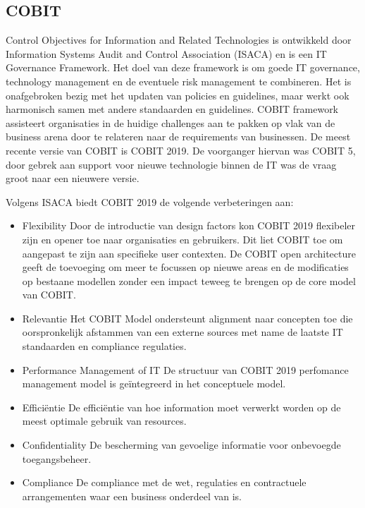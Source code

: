 \subsection{COBIT}
Control Objectives for Information and Related Technologies is ontwikkeld door Information Systems Audit and Control Association (ISACA) en is een IT Governance Framework. Het doel van deze framework is om goede IT governance, technology management en de eventuele risk management te combineren. \autocite{Khther2013} 
Het is onafgebroken bezig met het updaten van policies en guidelines, maar werkt ook harmonisch samen met andere standaarden en guidelines. COBIT framework assisteert organisaties in de huidige challenges aan te pakken op vlak van de business arena door te relateren naar de requirements van businessen.
De meest recente versie van COBIT is COBIT 2019. De voorganger hiervan was COBIT 5, door gebrek aan support voor nieuwe technologie binnen de IT was de vraag groot naar een nieuwere versie.

Volgens ISACA biedt COBIT 2019 de volgende verbeteringen aan:

\begin{itemize}
    \item Flexibility
    Door de introductie van design factors kon COBIT 2019 flexibeler zijn en opener toe naar organisaties en gebruikers. Dit liet COBIT toe om aangepast te zijn aan specifieke user contexten. De COBIT open architecture geeft de toevoeging om meer te focussen op nieuwe areas en de modificaties op bestaane modellen zonder een impact teweeg te brengen op de core model van COBIT. \autocite{Mikkola2021}
    \item Relevantie
    Het COBIT Model ondersteunt alignment naar concepten toe die oorspronkelijk afstammen van een externe sources met name de laatste IT standaarden en compliance regulaties. \autocite{Khther2013}
    \item Performance Management of IT 
    De structuur van COBIT 2019 perfomance management model is geïntegreerd in het conceptuele model.
    \item Efficiëntie
    De efficiëntie van hoe information moet verwerkt worden op de meest optimale gebruik van resources.
    \item Confidentiality
    De bescherming van gevoelige informatie voor onbevoegde toegangsbeheer.
    \item Compliance
    De compliance met de wet, regulaties en contractuele arrangementen waar een business onderdeel van is.
\end{itemize}

